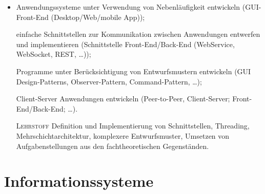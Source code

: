 \begin{itemize}[label={-}]
    \item Anwendungssysteme unter Verwendung von Nebenläufigkeit entwickeln
        {\color{red}(GUI-Front-End (Desktop/Web/mobile App))};
    \item[] einfache Schnittstellen zur Kommunikation zwischen Anwendungen entwerfen und implementieren
        {\color{red}(Schnittstelle Front-End/Back-End (WebService, WebSocket, REST, \dots))};
    \item[] Programme unter Berücksichtigung von Entwurfsmustern entwickeln
        {\color{red}(GUI Design-Patterns, Observer-Pattern, Command-Pattern, \dots)};
    \item[] Client-Server Anwendungen entwickeln
        {\color{red}(Peer-to-Peer, Client-Server; Front-End/Back-End; \dots)}.
    \item[\tiny\textsc{Lehrstoff}] Definition und Implementierung von Schnittstellen, Threading, Mehrschichtarchitektur, komplexere Entwurfsmuster, Umsetzen von Aufgabenstellungen aus den fachtheoretischen Gegenständen.
\end{itemize}


\section{Informationssysteme}



